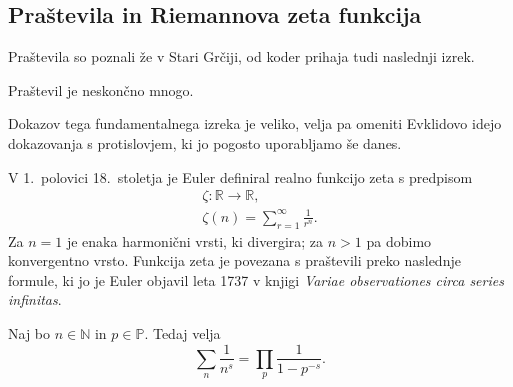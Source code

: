\documentclass[mat1]{fmfdelo}
\begin{document}
\subsection{Praštevila in Riemannova zeta funkcija}

Praštevila so poznali že v Stari Grčiji, od koder prihaja tudi naslednji izrek.
\begin{izrek}[Evklid]
Praštevil je neskončno mnogo.
\end{izrek}

Dokazov tega fundamentalnega izreka je veliko, velja pa omeniti Evklidovo idejo dokazovanja s protislovjem, ki jo pogosto uporabljamo še danes.

V 1.~polovici 18.~stoletja je Euler definiral realno funkcijo zeta s predpisom
\begin{align}
\zeta \colon \mathbb{R} \rightarrow \mathbb{R}, \nonumber \\
\zeta(n) = \sum_{r=1}^{\infty}\frac{1}{r^n}.
\end{align}
Za $n=1$ je enaka harmonični vrsti, ki divergira; za $n>1$ pa dobimo konvergentno vrsto. Funkcija zeta je povezana s praštevili preko naslednje formule, ki jo je Euler objavil leta 1737 v knjigi \emph{Variae observationes circa series infinitas}.

\begin{izrek}
\label{izr:EulProdukt}
Naj bo $n\in\mathbb{N}$ in $p\in\mathbb{P}$. Tedaj velja
\begin{equation}
\sum_{n}\frac{1}{n^s} = \prod_{p}\frac{1}{1-p^{-s}}.
\end{equation}
\end{izrek}
\end{document}
